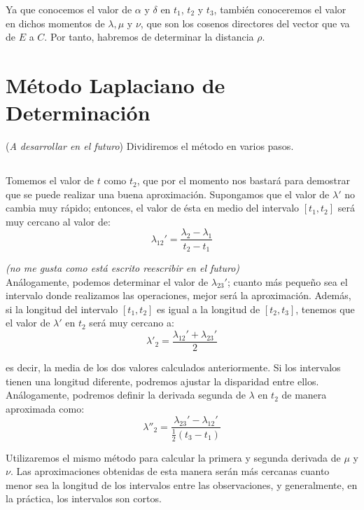 \documentclass[11pt]{article}
\begin{document}
Ya que conocemos el valor de $\alpha$ y $\delta$ en $t_1$, $t_2$ y $t_3$, también conoceremos el valor en dichos momentos de $\lambda, \mu$ y $\nu$, que son los cosenos directores del vector que va de $E$ a $C$. Por tanto, habremos de determinar la distancia $\rho$.\\

\section{Método Laplaciano de Determinación}
(\textit{A desarrollar en el futuro}) Dividiremos el método en varios pasos.\\

\subsection{}

Tomemos el valor de $t$ como $t_2$, que por el momento nos bastará para demostrar que se puede realizar una buena aproximación. Supongamos que el valor de $\lambda'$ no cambia muy rápido; entonces, el valor de ésta en medio del intervalo $[t_1,t_2]$ será muy cercano al valor de:
\[
\lambda_{12}'=\frac{\lambda_2-\lambda_1}{t_2-t_1}
\]

\textit{(no me gusta como está escrito reescribir en el futuro)}\\

Análogamente, podemos determinar el valor de $\lambda_{23}'$; cuanto más pequeño sea el intervalo donde realizamos las operaciones, mejor será la aproximación. Además, si la longitud del intervalo $[t_1,t_2]$ es igual a la longitud de $[t_2,t_3]$, tenemos que el valor de $\lambda'$ en $t_2$ será muy cercano a:
\[
\lambda'_2=\frac{\lambda_{12}'+\lambda_{23}'}{2}
\]

\noindent es decir, la media de los dos valores calculados anteriormente. Si los intervalos tienen una longitud diferente, podremos ajustar la disparidad entre ellos.\\

Análogamente, podremos definir la derivada segunda de $\lambda$ en $t_2$ de manera aproximada como:
\[
\lambda''_2=\frac{\lambda_{23}'-\lambda_{12}'}{\frac{1}{2}(t_3-t_1)}
\]

Utilizaremos el mismo método para calcular la primera y segunda derivada de $\mu$ y $\nu$. Las aproximaciones obtenidas de esta manera serán más cercanas cuanto menor sea la longitud de los intervalos entre las observaciones, y generalmente, en la práctica, los intervalos son cortos.\\
\end{document}

